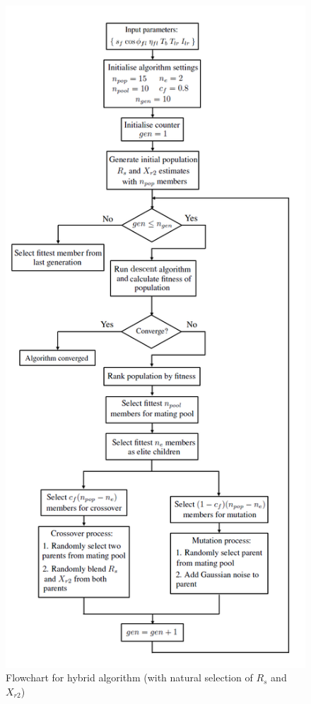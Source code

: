 \documentclass{article}
\begin{document}
\begin{figure}
\begin{center}
\includegraphics[scale=0.52]{./Figures/Hybrid_Algorithm.png}
\caption{Flowchart for hybrid algorithm (with natural selection of $R_{s}$ and $X_{r2}$)}
\label{fig:hybrid_algorithm}
\end{center}
\end{figure}
\end{document}
